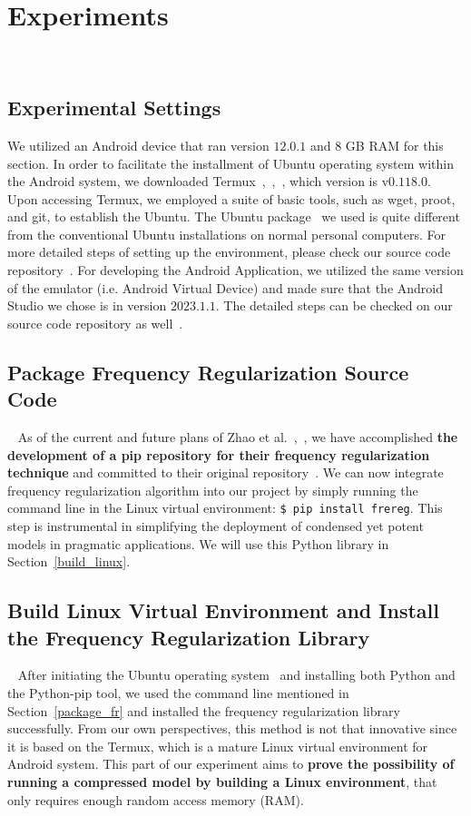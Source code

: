 \documentclass[runningheads]{llncs}
\begin{document}
\section{Experiments} ~\label{experiments}
\subsection{Experimental Settings}
We utilized an Android device that ran version $12.0.1$ and $8$ GB RAM for this section. In order to facilitate the installment of Ubuntu operating system within the Android system, we downloaded Termux~\cite{termux_repo},~\cite{termux_overview},~\cite{termux_wiki}, which version is v$0.118.0$. Upon accessing Termux, we employed a suite of basic tools, such as wget, proot, and git, to establish the Ubuntu. The Ubuntu package~\cite{ubuntu_in_termux_repo} we used is quite different from the conventional Ubuntu installations on normal personal computers. For more detailed steps of setting up the environment, please check our source code repository~\cite{nerual_on_mobile_repo}. For developing the Android Application, we utilized the same version of the emulator (i.e. Android Virtual Device) and made sure that the Android Studio we chose is in version $2023.1.1$. The detailed steps can be checked on our source code repository as well~\cite{nerual_on_mobile_repo}.


\subsection{Package Frequency Regularization Source Code}~\label{package_fr}
As of the current and future plans of Zhao et al.~\cite{fr_repo},~\cite{zhao2023fr}, we have accomplished \textbf{the development of a pip repository for their frequency regularization technique} and committed to their original repository~\cite{fr_repo}. We can now integrate frequency regularization algorithm into our project by simply running the command line in the Linux virtual environment: \texttt{\$ pip install frereg}. This step is instrumental in simplifying the deployment of condensed yet potent models in pragmatic applications. We will use this Python library in Section~\ref{build_linux}.

\subsection{Build Linux Virtual Environment and Install the Frequency Regularization Library} ~\label{build_linux}
After initiating the Ubuntu operating system~\cite{ubuntu_in_termux_repo} and installing both Python and the Python-pip tool, we used the command line mentioned in Section~\ref{package_fr} and installed the frequency regularization library successfully. From our own perspectives, this method is not that innovative since it is based on the Termux, which is a mature Linux virtual environment for Android system. This part of our experiment aims to \textbf{prove the possibility of running a compressed model by building a Linux environment}, that only requires enough random access memory (RAM).
\end{document}
